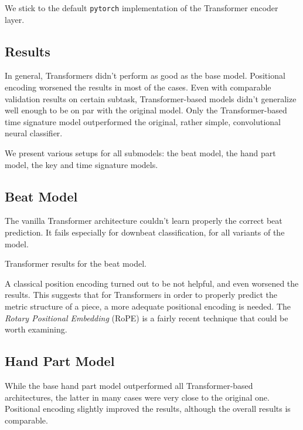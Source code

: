 We stick to the default \texttt{pytorch} implementation of the Transformer encoder layer.

\subsection{Results}

In general, Transformers didn't perform as good as the base model. Positional encoding worsened the results in most of the cases. Even with comparable validation results on certain subtask, Transformer-based models didn't generalize well enough to be on par with the original model. Only the Transformer-based time signature model outperformed the original, rather simple, convolutional neural classifier.

We present various setups for all submodels: the beat model, the hand part model, the key and time signature models.

\subsection{Beat Model}

The vanilla Transformer architecture couldn't learn properly the correct beat prediction. It fails especially for downbeat classification, for all variants of the model.

\begin{table}[ht!]
\centering

\caption[Transformer results for the beat model.]{Transformer results for the beat model.}
\label{beat_transformer}
\end{table}

A classical position encoding turned out to be not helpful, and even worsened the results. This suggests that for Transformers in order to properly predict the metric structure of a piece, a more adequate positional encoding is needed. The \emph{Rotary Positional Embedding} (RoPE) \cite{Su2024} is a fairly recent technique that could be worth examining.

\subsection{Hand Part Model}

While the base hand part model outperformed all Transformer-based architectures, the latter in many cases were very close to the original one. Positional encoding slightly improved the results, although the overall results is comparable.

